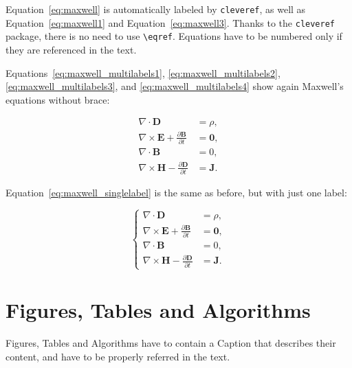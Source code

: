 \documentclass[11pt,a4paper]{article}
\begin{document}
    Equation~\eqref{eq:maxwell} is automatically labeled by \texttt{cleveref}, as well as Equation~\eqref{eq:maxwell1} and Equation~\eqref{eq:maxwell3}. Thanks to the \verb|cleveref| package, there is no need to use \verb|\eqref|. Equations have to be numbered only if they are referenced in the text.

    Equations~\eqref{eq:maxwell_multilabels1}, \eqref{eq:maxwell_multilabels2}, \eqref{eq:maxwell_multilabels3}, and \eqref{eq:maxwell_multilabels4} show again Maxwell's equations without brace:

    \begin{align}
        \nabla\cdot \bm{D} & = \rho, \label{eq:maxwell_multilabels1} \\
        \nabla \times \bm{E} +  \frac{\partial \bm{B}}{\partial t} &= \bm{0}, \label{eq:maxwell_multilabels2} \\
        \nabla\cdot \bm{B} & = 0, \label{eq:maxwell_multilabels3} \\
        \nabla \times \bm{H} - \frac{\partial \bm{D}}{\partial t} &= \bm{J} \label{eq:maxwell_multilabels4}.
    \end{align}

    Equation~\eqref{eq:maxwell_singlelabel} is the same as before,
    but with just one label:

    \begin{equation}
        \label{eq:maxwell_singlelabel}
        \left\{
        \begin{aligned}
            \nabla\cdot \bm{D} & = \rho, \\
            \nabla \times \bm{E} +  \frac{\partial \bm{B}}{\partial t} &= \bm{0},\\
            \nabla\cdot \bm{B} & = 0, \\
            \nabla \times \bm{H} - \frac{\partial \bm{D}}{\partial t} &= \bm{J}.
        \end{aligned}
        \right.
    \end{equation}

\section{Figures, Tables and Algorithms}

    Figures, Tables and Algorithms have to contain a Caption that describes their content, and have to be properly referred in the text.
\end{document}
